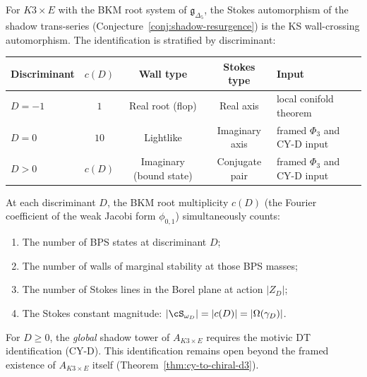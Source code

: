 \begin{conjecture}[Stokes \texorpdfstring{$=$}{=} WC for \texorpdfstring{$K3 \times E$}{K3 x E}]
\label{conj:stokes-wc-k3e}
\ClaimStatusConjectured
For $K3 \times E$ with the BKM root system of $\mathfrak{g}_{\Delta_5}$, the Stokes automorphism of the shadow trans-series \textup{(}Conjecture~\textup{\ref{conj:shadow-resurgence})} is the KS wall-crossing automorphism. The identification is stratified by discriminant:
\begin{center}
\renewcommand{\arraystretch}{1.25}
\begin{tabular}{@{}lcccl@{}}
\toprule
\textbf{Discriminant} & $c(D)$ & \textbf{Wall type} & \textbf{Stokes type} & \textbf{Input} \\
\midrule
$D = -1$ & $1$ & Real root (flop) & Real axis & local conifold theorem \\
$D = 0$ & $10$ & Lightlike & Imaginary axis & framed $\Phi_3$ and CY-D input \\
$D > 0$ & $c(D)$ & Imaginary (bound state) & Conjugate pair & framed $\Phi_3$ and CY-D input \\
\bottomrule
\end{tabular}
\end{center}
At each discriminant $D$, the BKM root multiplicity $c(D)$ \textup{(}the Fourier coefficient of the weak Jacobi form $\phi_{0,1}$\textup{)} simultaneously counts:
\begin{enumerate}[label=\textup{(\alph*)}]
 \item The number of BPS states at discriminant $D$;
 \item The number of walls of marginal stability at those BPS masses;
 \item The number of Stokes lines in the Borel plane at action $|Z_D|$;
 \item The Stokes constant magnitude: $|\cS_{\omega_D}| = |c(D)| = |\Omega(\gamma_D)|$.
\end{enumerate}
For $D \geq 0$, the \emph{global} shadow tower of $A_{K3 \times E}$ requires the motivic DT identification (CY-D). This identification remains open beyond the framed existence of $A_{K3 \times E}$ itself \textup{(}Theorem~\ref{thm:cy-to-chiral-d3}\textup{)}.
\end{conjecture}

